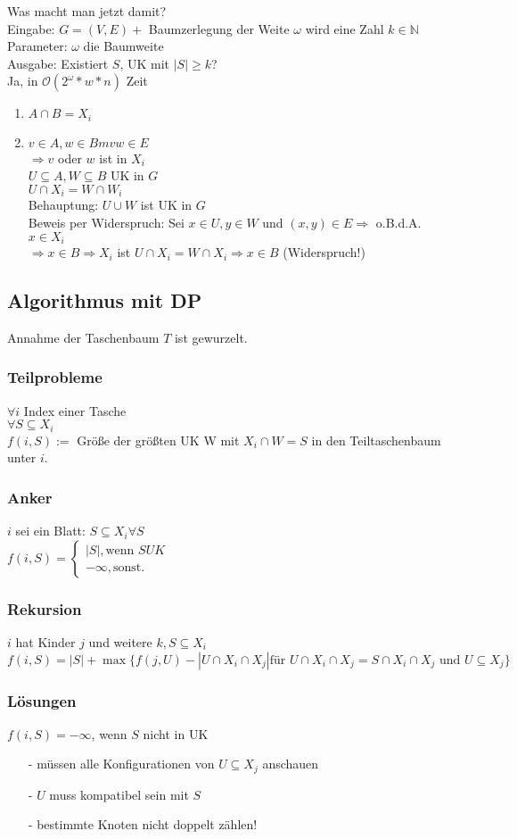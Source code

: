 Was macht man jetzt damit?\\
Eingabe: $G = (V,E) + $ Baumzerlegung der Weite $\omega$ wird eine Zahl $k \in \mathbb{N}$\\
Parameter: $\omega$ die Baumweite\\
Ausgabe: Existiert $S$, UK mit $|S| \geq k$?\\
Ja, in $\mathcal{O}(2^\omega * w * n)$ Zeit\\
\begin{enumerate}
\item $A \cap	B = X_i$
\item $v \in A, w \in Bm vw \in E $\\
$\Rightarrow v$ oder $w$ ist in $X_i$\\
$U \subseteq A, W \subseteq B$ UK in $G$\\
$U \cap X_i = W \cap W_i$\\
Behauptung: $U \cup W$ ist UK in $G$\\
Beweis per Widerspruch: Sei $x \in U, y \in W$ und $(x,y) \in E \Rightarrow $ o.B.d.A. $x \in X_i $\\
$\Rightarrow x \in B \Rightarrow X_i $ ist $ U \cap X_i = W \cap X_i \Rightarrow x \in B $ (Widerspruch!)\\
\end{enumerate}

\subsection{Algorithmus mit DP}
Annahme der Taschenbaum $T$ ist gewurzelt.
\subsubsection{Teilprobleme}
$\forall i $ Index einer Tasche\\
$\forall S \subseteq X_i$\\
$f(i,S) := $ Größe der größten UK W mit $X_i \cap W =S$ in den Teiltaschenbaum unter $i$.\\
\subsubsection{Anker}
$i$ sei ein Blatt: $S \subseteq X_i \forall S$\\
$f(i,S) = \begin{cases}
|S|, \text{wenn } S UK\\
-\infty, \text{sonst}.
\end{cases} $
\subsubsection{Rekursion}
$i$ hat Kinder $j$ und weitere $k, S \subseteq X_i$\\
$f(i,S) = |S| + \max \{f(j,U) - |U \cap X_i \cap X_j| \text{für } U\cap X_i \cap X_j = S \cap X_i \cap X_j \text{ und } U \subseteq X_j \}$
\subsubsection{Lösungen}
$f(i,S) = -\infty$, wenn $S$ nicht in UK
\begin{enumerate}
\item[-] müssen alle Konfigurationen von $U \subseteq X_j$ anschauen
\item[-] $U$ muss kompatibel sein mit $S$
\item[-] bestimmte Knoten nicht doppelt zählen!
\end{enumerate}